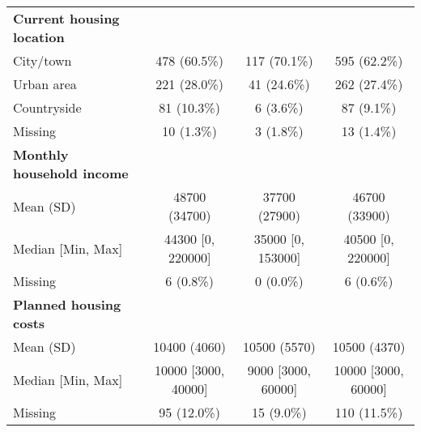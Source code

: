 \begin{table}[h]
\begin{threeparttable}
\begin{tabular}{lccc}
\textbf{Current housing location} \\
\hspace{1em}City/town & 478 (60.5\%) & 117 (70.1\%) & 595 (62.2\%) \\
\hspace{1em}Urban area & 221 (28.0\%) & 41 (24.6\%) & 262 (27.4\%) \\
\hspace{1em}Countryside & 81 (10.3\%) & 6 (3.6\%) & 87 (9.1\%) \\
\hspace{1em}Missing & 10 (1.3\%) & 3 (1.8\%) & 13 (1.4\%) \\

\textbf{Monthly household income} \\
\hspace{1em}Mean (SD) & 48700 (34700) & 37700 (27900) & 46700 (33900) \\
\hspace{1em}Median [Min, Max] & 44300 [0, 220000] & 35000 [0, 153000] & 40500 [0, 220000] \\
\hspace{1em}Missing & 6 (0.8\%) & 0 (0.0\%) & 6 (0.6\%) \\

\textbf{Planned housing costs} \\
\hspace{1em}Mean (SD) & 10400 (4060) & 10500 (5570) & 10500 (4370) \\
\hspace{1em}Median [Min, Max] & 10000 [3000, 40000] & 9000 [3000, 60000] & 10000 [3000, 60000] \\
\hspace{1em}Missing & 95 (12.0\%) & 15 (9.0\%) & 110 (11.5\%) \\
\bottomrule
\end{tabular}
\end{threeparttable}
\end{table}
